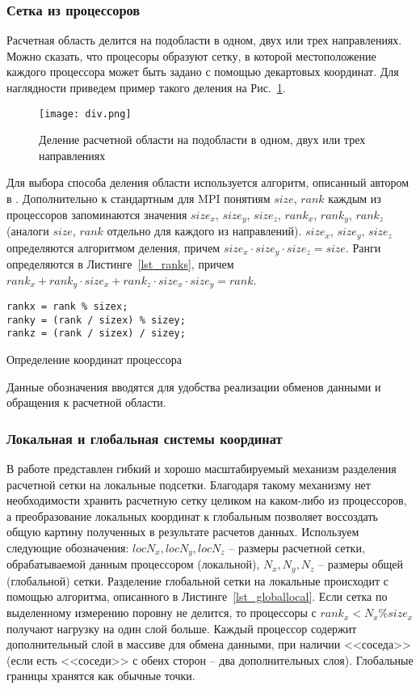 \subsubsection*{Сетка из процессоров}
Расчетная область делится на подобласти в одном, двух или трех направлениях.
Можно сказать, что процесоры образуют сетку, в которой
местоположение каждого процессора может быть задано с помощью
декартовых координат.
Для наглядности приведем пример такого деления на Рис.~\ref{pic_div}.
\begin{figure}[!h]\center
\texttt{[image: div.png]} 
\caption{Деление расчетной области на подобласти в одном, двух или трех направлениях}
\label{pic_div}
\end{figure}
Для выбора способа деления области используется алгоритм,
описанный автором в \cite{Mathmod-2014}.
Дополнительно к стандартным для MPI понятиям $size$, $rank$
каждым из процессоров запоминаются значения $size_x$, $size_y$, $size_z$,
$rank_x$, $rank_y$, $rank_z$ (аналоги $size$, $rank$ отдельно для каждого из направлений).
$size_x$, $size_y$, $size_z$ определяются алгоритмом деления,
причем $size_x \cdot size_y \cdot size_z = size$.
Ранги определяются в Листинге~\ref{lst_ranks}, причем
$rank_x + rank_y \cdot size_x + rank_z \cdot size_x \cdot size_y = rank$.
\begin{listing}
\begin{verbatim}
rankx = rank % sizex;
ranky = (rank / sizex) % sizey;
rankz = (rank / sizex) / sizey;
\end{verbatim}
\caption{Определение координат процессора}
\label{lst_ranks}
\end{listing}
Данные обозначения вводятся для удобства реализации обменов
данными и обращения к расчетной области.

\subsubsection*{Локальная и глобальная системы координат}
В работе представлен гибкий и хорошо масштабируемый механизм разделения
расчетной сетки на локальные подсетки. Благодаря такому механизму
нет необходимости хранить расчетную сетку целиком на каком-либо из
процессоров, а преобразование локальных координат к глобальным
позволяет воссоздать общую картину полученных в результате расчетов
данных.
Используем следующие обозначения:
$locN_x, locN_y, locN_z$ -- размеры расчетной сетки, обрабатываемой
данным процессором (локальной), $N_x, N_y, N_z$ -- размеры общей (глобальной) сетки.
Разделение глобальной сетки на локальные происходит с помощью
алгоритма, описанного в Листинге~\ref{lst_globallocal}. 
Если сетка по выделенному измерению поровну не делится, то процессоры с $rank_x < N_x \% size_x$ получают нагрузку
на один слой больше. Каждый процессор содержит дополнительный слой в массиве для обмена данными, при 
наличии <<соседа>> (если есть <<соседи>> с обеих сторон -- два дополнительных слоя).
Глобальные границы хранятся как обычные точки.

